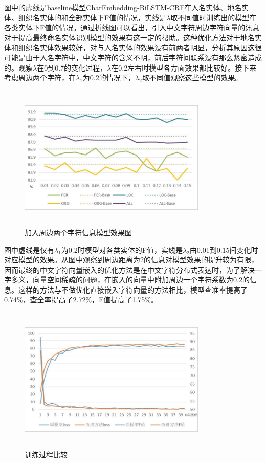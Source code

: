 \documentclass[winfonts,master,oneside,nobackinfo]{njuthesis}
\begin{document}
图中的虚线是baseline模型CharEmbedding-BiLSTM-CRF在人名实体、地名实体、组织名实体的和全部实体下F值的情况，实线是$\lambda$取不同值时训练出的模型在各类实体下F值的情况。通过折线图可以看出，引入中文字符周边字符向量的讯息对于提高最终命名实体识别模型的效果有这一定的帮助。这种优化方法对于地名实体和组织名实体效果较好，对与人名实体的效果没有前两者明显，分析其原因这很可能是由于人名字符中，中文字符的含义不明，前后字符间联系没有那么紧密造成的。观察$\lambda$在0到0.7的变化过程，$\lambda$在0.2左右时模型各方面效果都比较好。接下来考虑周边两个字符，在$\lambda_{1}$为0.2的情况下，$\lambda_{2}$取不同值观察这些模型的效果。

\begin{figure}[H]
\centering
\begin{minipage}[t]{\textwidth}
\includegraphics[width=0.8\textwidth,height=7cm]{./figure/参数2.jpg}
\caption{加入周边两个字符信息模型效果图}
\label{lab:1}
\end{minipage}
\end{figure}

图中虚线是仅有$\lambda_{1}$为0.2时模型对各类实体的F值，实线是$\lambda_{2}$由0.01到0.15间变化时对应模型的效果。从图中观察到周边距离为2的信息对模型效果的提升较为有限，因而最终的中文字符向量嵌入的优化方法是在中文字符分布式表达时，为了解决一字多义，向量空间稀疏的问题，在嵌入的向量中附加周边一个字符系数为0.2的信息。这样的方法与不做优化直接嵌入字符向量的方法相比，模型查准率提高了0.74\%，查全率提高了2.72\%，F值提高了1.75\%。

\begin{figure}[H]
\centering
\begin{minipage}[t]{\textwidth}
\includegraphics[width=0.8\textwidth,height=7cm]{./figure/训练过程.jpg}
\caption{训练过程比较}
\label{lab:1}
\end{minipage}
\end{figure}
\end{document}

